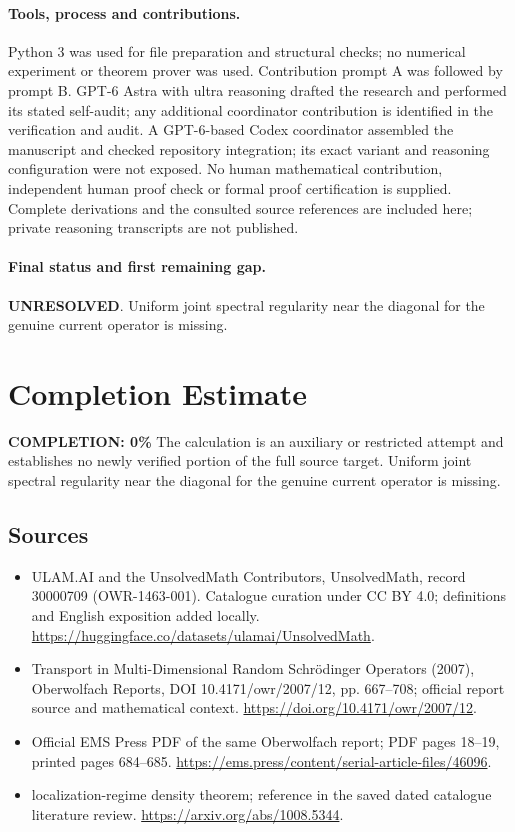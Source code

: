 \documentclass[11pt]{article}
\begin{document}
\paragraph{Tools, process and contributions.}
Python 3 was used for file preparation and structural checks; no numerical experiment or theorem prover was used. Contribution prompt A was followed by prompt B. GPT-6 Astra with ultra reasoning drafted the research and performed its stated self-audit; any additional coordinator contribution is identified in the verification and audit. A GPT-6-based Codex coordinator assembled the manuscript and checked repository integration; its exact variant and reasoning configuration were not exposed. No human mathematical contribution, independent human proof check or formal proof certification is supplied. Complete derivations and the consulted source references are included here; private reasoning transcripts are not published.

\paragraph{Final status and first remaining gap.}
\textbf{UNRESOLVED}. Uniform joint spectral regularity near the diagonal for the genuine current operator is missing.

\section{Completion Estimate}
\noindent\textbf{COMPLETION: 0\%}
The calculation is an auxiliary or restricted attempt and establishes no newly verified portion of the full source target. Uniform joint spectral regularity near the diagonal for the genuine current operator is missing.

\subsection{Sources}
\begin{itemize}
\item[\hypertarget{source:30000709:1}{S1}] ULAM.AI and the UnsolvedMath Contributors, UnsolvedMath, record 30000709 (OWR-1463-001). Catalogue curation under CC BY 4.0; definitions and English exposition added locally.
\url{https://huggingface.co/datasets/ulamai/UnsolvedMath}.
\item[\hypertarget{source:30000709:2}{S2}] Transport in Multi-Dimensional Random Schrödinger Operators (2007), Oberwolfach Reports, DOI 10.4171/owr/2007/12, pp. 667--708; official report source and mathematical context.
\url{https://doi.org/10.4171/owr/2007/12}.
\item[\hypertarget{source:30000709:3}{S3}] Official EMS Press PDF of the same Oberwolfach report; PDF pages 18--19, printed pages 684--685.
\url{https://ems.press/content/serial-article-files/46096}.
\item[\hypertarget{source:30000709:4}{S4}] localization-regime density theorem; reference in the saved dated catalogue literature review.
\url{https://arxiv.org/abs/1008.5344}.
\end{itemize}
\label{end:30000709}
\end{document}

